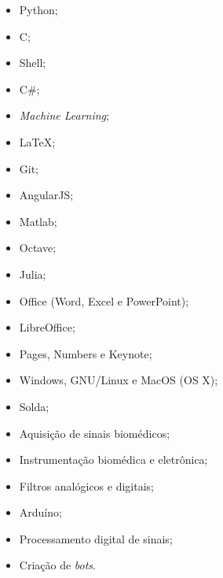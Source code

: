 \documentclass[11pt]{article}
\begin{document}
\begin{multicols}{3} %
\begin{itemize}
    \item Python;
    \item C;
    \item Shell;
    \item C\#;
    \item \textit{Machine Learning};
    \item \LaTeX ;
    \item Git;
    \item AngularJS;
    \item Matlab;
    \item Octave;
    \item Julia;
    \item Office (Word, Excel e PowerPoint);
    \item LibreOffice;
    \item Pages, Numbers e Keynote;
    \item Windows, GNU/Linux e MacOS (OS X);
    \item Solda;
    \item Aquisição de sinais biomédicos;
    \item Instrumentação biomédica e eletrônica;
    \item Filtros analógicos e digitais;
    \item Arduíno;
    \item Processamento digital de sinais;
    \item Criação de \textit{bots}.
\end{itemize}
\end{multicols}
\end{document}
